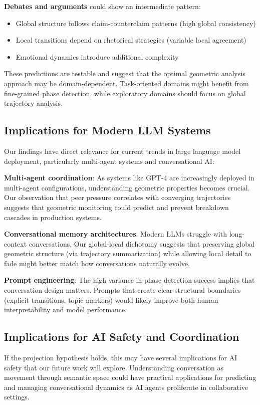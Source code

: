 \documentclass[11pt,letterpaper]{article}
\begin{document}
\textbf{Debates and arguments} could show an intermediate pattern:
\begin{itemize}
\item Global structure follows claim-counterclaim patterns (high global consistency)
\item Local transitions depend on rhetorical strategies (variable local agreement)
\item Emotional dynamics introduce additional complexity
\end{itemize}

These predictions are testable and suggest that the optimal geometric analysis approach may be domain-dependent. Task-oriented domains might benefit from fine-grained phase detection, while exploratory domains should focus on global trajectory analysis.

\subsection{Implications for Modern LLM Systems}

Our findings have direct relevance for current trends in large language model deployment, particularly multi-agent systems and conversational AI:

\textbf{Multi-agent coordination}: As systems like GPT-4 are increasingly deployed in multi-agent configurations, understanding geometric properties becomes crucial. Our observation that peer pressure correlates with converging trajectories suggests that geometric monitoring could predict and prevent breakdown cascades in production systems.

\textbf{Conversational memory architectures}: Modern LLMs struggle with long-context conversations. Our global-local dichotomy suggests that preserving global geometric structure (via trajectory summarization) while allowing local detail to fade might better match how conversations naturally evolve.

\textbf{Prompt engineering}: The high variance in phase detection success implies that conversation design matters. Prompts that create clear structural boundaries (explicit transitions, topic markers) would likely improve both human interpretability and model performance.

\subsection{Implications for AI Safety and Coordination}

If the projection hypothesis holds, this may have several implications for AI safety that our future work will explore. Understanding conversation as movement through semantic space could have practical applications for predicting and managing conversational dynamics as AI agents proliferate in collaborative settings.
\end{document}
